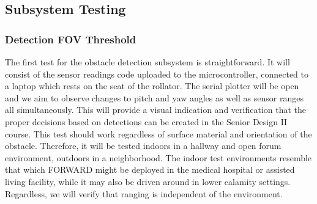 \subsection{Subsystem Testing}

\subsubsection{Detection FOV Threshold} \label{ardumatlab}
\noindent The first test for the obstacle detection subsystem is straightforward. It will consist of the sensor readings code uploaded to the microcontroller, connected to a laptop which rests on the seat of the rollator. The serial plotter will be open and we aim to observe changes to pitch and yaw angles as well as sensor ranges all simultaneously. This will provide a visual indication and verification that the proper decisions based on detections can be created in the Senior Design II course. This test should work regardless of surface material and orientation of the obstacle. Therefore, it will be tested indoors in a hallway and open forum environment, outdoors in a neighborhood. The indoor test environments resemble that which FORWARD might be deployed in the medical hospital or assisted living facility, while it may also be driven around in lower calamity settings. Regardless, we will verify that ranging is independent of the environment.\\

